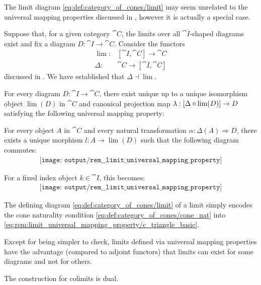 \begin{remark}\label{rem:limit_universal_mapping_property}
  The limit diagram \eqref{eq:def:category_of_cones/limit} may seem unrelated to the universal mapping properties discussed in , however it is actually a special case.

  Suppose that, for a given category \( \cat{C} \), the limits over all \( \cat{I} \)-shaped diagrams exist and fix a diagram \( D: \cat{I} \to \cat{C} \). Consider the functors
  \begin{align*}
    \lim:   &[\cat{I}, \cat{C}] \to \cat{C} \\
    \Delta: &\cat{C} \to [\cat{I}, \cat{C}]
  \end{align*}
  discussed in . We have established that \( \Delta \dashv \lim \).

  For every diagram \( D: \cat{I} \to \cat{C} \), there exist unique up to a unique isomorphism object \( \lim(D) \) in \( \cat{C} \) and canonical projection map \( \lambda: [\Delta \bincirc {\lim}(D)] \to D \) satisfying the following universal mapping property:
  \begin{displayquote}
    For every object \( A \) in \( \cat{C} \) and every natural transformation \( \alpha: \Delta(A) \Rightarrow D \), there exists a unique morphism \( l: A \to \lim(D) \) such that the following diagram commutes:
    \begin{equation}\label{eq:rem:limit_universal_mapping_property/ic_triangle}
      \begin{aligned}
        \texttt{[image: output/rem\_\_limit\_universal\_mapping\_property]}
      \end{aligned}
    \end{equation}
  \end{displayquote}

  For a fixed index object \( k \in \cat{I} \), this becomes:
  \begin{equation}\label{eq:rem:limit_universal_mapping_property/c_triangle_basic}
    \begin{aligned}
      \texttt{[image: output/rem\_\_limit\_universal\_mapping\_property]}
    \end{aligned}
  \end{equation}

  The defining diagram \eqref{eq:def:category_of_cones/limit} of a limit simply encodes the cone naturality condition \eqref{eq:def:category_of_cones/cone_nat} into \eqref{eq:rem:limit_universal_mapping_property/c_triangle_basic}.

  Except for being simpler to check, limits defined via universal mapping properties have the advantage (compared to adjoint functors) that limits can exist for some diagrams and not for others.

  The construction for colimits is dual.
\end{remark}

